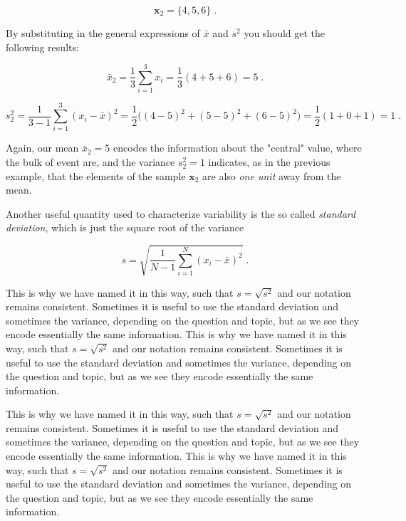 \documentclass{book}
\begin{document}
\begin{equation}
	\textbf{x}_2 = \{4, 5, 6\} \; . \nonumber
\end{equation}

By substituting in the general expressions of $\bar{x}$ and $s^2$ you should get the following results: 

\begin{equation}
	\bar{x}_2 = \frac{1}{3} \sum_{i = 1}^{3} x_{i} = \frac{1}{3} (4 + 5 + 6) = 5 \; . \nonumber
\end{equation}

\begin{equation}
	s^2_2 = \frac{1}{3 - 1} \sum_{i = 1}^{3} (x_{i} - \bar{x})^{2} = \frac{1}{2} \big((4 - 5)^{2} + (5 - 5)^{2} + (6 - 5)^{2}\big) = \frac{1}{2} (1 + 0 + 1) = 1 \; . \nonumber
\end{equation}

Again, our mean $\bar{x}_2 = 5$ encodes the information about the "central" value, where the bulk of event are, and the variance $s^2_2 = 1$ indicates, as in the previous example, that the elements of the sample $\textbf{x}_2$ are also \textit{one unit} away from the mean.

\medskip

Another useful quantity used to characterize variability is the so called \textit{standard deviation}, which is just the square root of the variance

\begin{equation}
	s = \sqrt{\frac{1}{N - 1} \sum_{i = 1}^{N} (x_{i} - \bar{x})^{2}} \; . 
\end{equation}

This is why we have named it in this way, such that $s = \sqrt{s^{2}}$ and our notation remains consistent. Sometimes it is useful to use the standard deviation and sometimes the variance, depending on the question and topic, but as we see they encode essentially the same information. This is why we have named it in this way, such that $s = \sqrt{s^{2}}$ and our notation remains consistent. Sometimes it is useful to use the standard deviation and sometimes the variance, depending on the question and topic, but as we see they encode essentially the same information.

\medskip

This is why we have named it in this way, such that $s = \sqrt{s^{2}}$ and our notation remains consistent. Sometimes it is useful to use the standard deviation and sometimes the variance, depending on the question and topic, but as we see they encode essentially the same information. This is why we have named it in this way, such that $s = \sqrt{s^{2}}$ and our notation remains consistent. Sometimes it is useful to use the standard deviation and sometimes the variance, depending on the question and topic, but as we see they encode essentially the same information.\\
\end{document}
